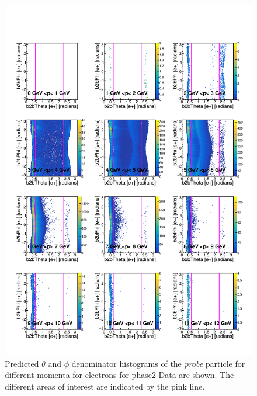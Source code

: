 \documentclass[a4paper,11pt,twosided,final,german,openbib,pdftex,listof=totoc,bibliography=totoc]{scrbook}
\begin{document}
\begin{appendix}
\begin{figure}[h!]
	\includegraphics[width=\textwidth]{Plots/RTPMemD_Data.pdf}
	\caption[Denominator $\theta$, $\phi$ Electron Momentum Data]{Predicted $\theta$ and $\phi$ denominator histograms of the \textit{probe} particle for different momenta for electrons for phase2 Data are shown. The different areas of interest are indicated by the pink line.}
	\label{plt:RTPMemD_Data}
\end{figure}






\end{appendix}
\end{document}
